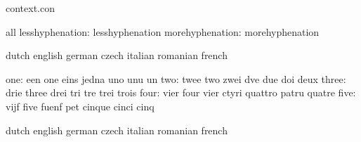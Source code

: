 


\startlogginginterface context.con


\startvariables all
    lesshyphenation: lesshyphenation
    morehyphenation: morehyphenation
\stopvariables



\startvariables            dutch                     english
                           german                    czech
                           italian                   romanian
                           french

                      one: een                       one
                           eins                      jedna
                           uno                       unu
                           un
                      two: twee                      two
                           zwei                      dve
                           due                       doi
                           deux
                    three: drie                      three
                           drei                      tri
                           tre                       trei
                           trois
                     four: vier                      four
                           vier                      ctyri
                           quattro                   patru
                           quatre
                     five: vijf                      five
                           fuenf                     pet
                           cinque                    cinci
                           cinq
\stopvariables


\startvariables            dutch                     english
                           german                    czech
                           italian                   romanian
                           french

